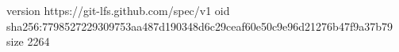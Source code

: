 version https://git-lfs.github.com/spec/v1
oid sha256:7798527229309753aa487d190348d6c29ceaf60e50c9e96d21276b47f9a37b79
size 2264
